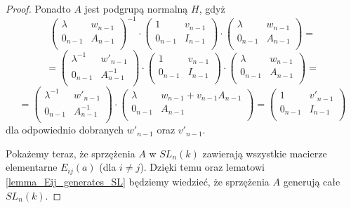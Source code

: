 \documentclass[licencjacka]{pracamgr}
\begin{document}
\begin{proof}
  Ponadto $A$ jest podgrupą normalną $H$, gdyż
  $$
    \left( \begin{array}{cc} \lambda & w_{n-1} \\ 0_{n-1} & A_{n-1} \\ \end{array} \right)^{-1} \cdot
    \left( \begin{array}{cc} 1 & v_{n-1} \\ 0_{n-1} & I_{n-1} \\ \end{array} \right)  \cdot
    \left( \begin{array}{cc} \lambda & w_{n-1} \\ 0_{n-1} & A_{n-1} \\ \end{array} \right) = 
  $$
  $$ = 
    \left( \begin{array}{cc} \lambda^{-1} & w'_{n-1} \\ 0_{n-1} & A^{-1}_{n-1} \\ \end{array} \right) \cdot
    \left( \begin{array}{cc} 1 & v_{n-1} \\ 0_{n-1} & I_{n-1} \\ \end{array} \right)  \cdot
    \left( \begin{array}{cc} \lambda & w_{n-1} \\ 0_{n-1} & A_{n-1} \\ \end{array} \right) = 
  $$
  $$ = 
    \left( \begin{array}{cc} \lambda^{-1} & w'_{n-1} \\ 0_{n-1} & A^{-1}_{n-1} \\ \end{array} \right) \cdot
    \left( \begin{array}{cc} \lambda & w_{n-1} + v_{n-1}A_{n-1} \\ 0_{n-1} & A_{n-1} \\ \end{array} \right) = 
    \left( \begin{array}{cc} 1 & v'_{n-1} \\ 0_{n-1} & I_{n-1} \\ \end{array} \right)  
  $$
  dla odpowiednio dobranych $w'_{n-1}$ oraz $v'_{n-1}$.

  Pokażemy teraz, że sprzężenia $A$ w $SL_n(k)$ zawierają wszystkie macierze elementarne $E_{i j}(a)$ (dla $i \ne j$).
  Dzięki temu oraz lematowi \ref{lemma_Eij_generates_SL} będziemy wiedzieć, że sprzężenia $A$ generują całe $SL_n(k)$.


\end{proof}
\end{document}
